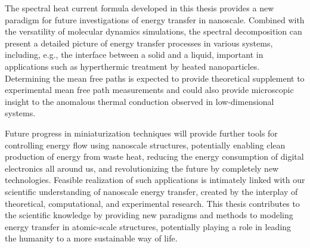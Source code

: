 The spectral heat current formula developed in this thesis provides a new paradigm for future investigations of energy transfer in nanoscale. Combined with the versatility of molecular dynamics simulations, the spectral decomposition can present a detailed picture of energy transfer processes in various systems, including, e.g., the interface between a solid and a liquid, important in applications such as hyperthermic treatment by heated nanoparticles. Determining the mean free paths is expected to provide theoretical supplement to experimental mean free path measurements and could also provide microscopic insight to the anomalous thermal conduction observed in low-dimensional systems.

Future progress in miniaturization techniques will provide further tools for controlling energy flow using nanoscale structures, potentially enabling clean production of energy from waste heat, reducing the energy consumption of digital electronics all around us, and revolutionizing the future by completely new technologies. Feasible realization of such applications is intimately linked with our scientific understanding of nanoscale energy transfer, created by the interplay of theoretical, computational, and experimental research. This thesis contributes to the scientific knowledge by providing new paradigms and methods to modeling energy transfer in atomic-scale structures, potentially playing a role in leading the humanity to a more sustainable way of life. 
